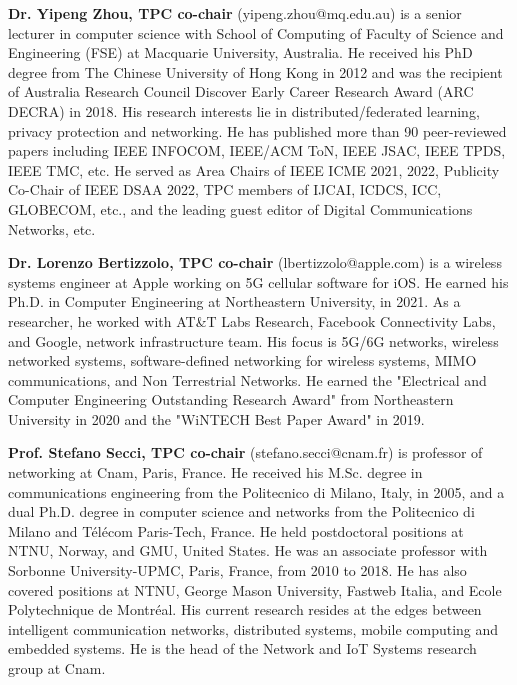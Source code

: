 \documentclass{easychair}
\begin{document}
\textbf{Dr. Yipeng Zhou, TPC co-chair} (yipeng.zhou@mq.edu.au) is a senior lecturer in computer science with School of Computing of Faculty of Science and Engineering (FSE) at Macquarie University, Australia. He received his PhD degree from The Chinese University of Hong Kong in 2012 and was the recipient of Australia Research Council Discover Early Career Research Award (ARC DECRA) in 2018. His research interests lie in distributed/federated learning, privacy protection and networking. He has published more than 90 peer-reviewed papers including IEEE INFOCOM, IEEE/ACM ToN, IEEE JSAC, IEEE TPDS, IEEE TMC, etc. He served as Area Chairs of IEEE ICME 2021, 2022, Publicity Co-Chair of IEEE DSAA 2022, TPC members of IJCAI, ICDCS, ICC, GLOBECOM, etc., and the leading guest editor of Digital Communications Networks, etc.



\textbf{Dr. Lorenzo Bertizzolo, TPC co-chair} (lbertizzolo@apple.com) is a wireless systems engineer at Apple working on 5G cellular software for iOS. He earned his Ph.D. in Computer Engineering at Northeastern University, in 2021. As a researcher, he worked with AT{\&}T Labs Research, Facebook Connectivity Labs, and Google, network infrastructure team. His focus is 5G/6G networks, wireless networked systems, software-defined networking for wireless systems, MIMO communications, and Non Terrestrial Networks. He earned the "Electrical and Computer Engineering Outstanding Research Award" from Northeastern University in 2020 and the "WiNTECH Best Paper Award" in 2019.



\textbf{Prof. Stefano Secci, TPC co-chair} (stefano.secci@cnam.fr) is professor of networking at Cnam, Paris, France. He received his M.Sc. degree in communications engineering from the Politecnico di Milano, Italy, in 2005, and a dual Ph.D. degree in computer science and networks from the Politecnico di Milano and T\'el\'ecom Paris-Tech, France. He held postdoctoral positions at NTNU, Norway, and GMU, United States. He was an associate professor with Sorbonne University-UPMC, Paris, France, from 2010 to 2018. He has also covered positions at NTNU, George Mason University, Fastweb Italia, and Ecole Polytechnique de Montr\'eal. His current research resides at the edges between intelligent communication networks, distributed systems, mobile computing and embedded systems. He is the head of the Network and IoT Systems research group at Cnam.
\end{document}
